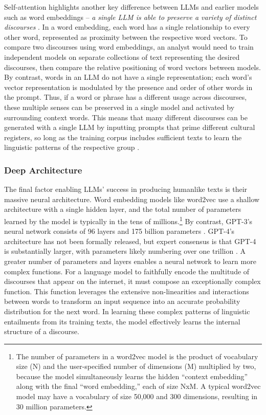 \documentclass{article} %
\begin{document}
Self-attention highlights another key difference between LLMs and
earlier models such as word embeddings -- \emph{a} \emph{single LLM is
able to preserve a variety of distinct discourses} \parencite{Argyle2023-ii}. In a
word embedding, each word has a single relationship to every other word,
represented as proximity between the respective word vectors. To compare
two discourses using word embeddings, an analyst would need to train
independent models on separate collections of text representing the
desired discourses, then compare the relative positioning of word
vectors between models. By contrast, words in an LLM do not have a
single representation; each word's vector representation is modulated by
the presence and order of other words in the prompt. Thus, if a word or
phrase has a different usage across discourses, these multiple senses
can be preserved in a single model and activated by surrounding context
words. This means that many different discourses can be generated with a
single LLM by inputting prompts that prime different cultural registers,
so long as the training corpus includes sufficient texts to learn the
linguistic patterns of the respective group
\parencite{Argyle2023-ii}.

\subsubsection*{Deep Architecture}

The final factor enabling LLMs' success in producing humanlike texts is
their massive neural architecture. Word embedding models like word2vec
use a shallow architecture with a single hidden layer, and the total
number of parameters learned by the model is typically in the tens of
millions.\footnote{The number of parameters in a word2vec model is the
  product of vocabulary size (N) and the user-specified number of
  dimensions (M) multiplied by two, because the model simultaneously
  learns the hidden ``context embedding'' along with the final ``word
  embedding,'' each of size NxM. A typical word2vec model may have a
  vocabulary of size 50,000 and 300 dimensions, resulting in 30 million
  parameters.} By contrast, GPT-3's neural network consists of 96 layers
and 175 billion parameters
\parencite{Brown2020-nh}. GPT-4's
architecture has not been formally released, but expert consensus is
that GPT-4 is substantially larger, with parameters likely numbering
over one trillion \parencite{OpenAI2023-kd}. A greater number of parameters and layers enables a neural
network to learn more complex functions. For a language model to
faithfully encode the multitude of discourses that appear on the
internet, it must compose an exceptionally complex function. This
function leverages the extensive non-linearities and interactions
between words to transform an input sequence into an accurate
probability distribution for the next word. In learning these complex
patterns of linguistic entailments from its training texts, the model
effectively learns the internal structure of a discourse.
\end{document}
